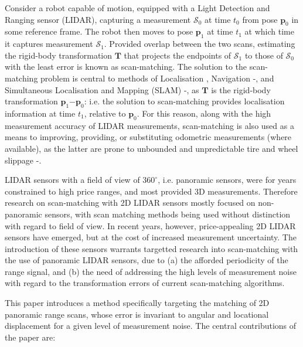 Consider a robot capable of motion, equipped with a Light Detection and Ranging
sensor (LIDAR), capturing a measurement $\mathcal{S}_0$ at time $t_0$ from pose
$\bm{p}_0$ in some reference frame. The robot then moves to pose $\bm{p}_1$ at
time $t_1$ at which time it captures measurement $\mathcal{S}_1$. Provided
overlap between the two scans, estimating the rigid-body transformation
$\bm{T}$ that projects the endpoints of $\mathcal{S}_1$ to those of
$\mathcal{S}_0$ with the least error is known as scan-matching. The solution to
the scan-matching problem is central to methods of Localisation
\cite{lidar_localisation_1}\cite{lidar_localisation_2}, Navigation
\cite{lidar_navigation_1}-\cite{lidar_navigation_4}, and Simultaneous
Localisation and Mapping (SLAM) \cite{lidar_slam_1}-\cite{lidar_slam_5}, as
$\bm{T}$ is the rigid-body transformation $\bm{p}_1$$-$$\bm{p}_0$: i.e. the
solution to scan-matching provides localisation information at time $t_1$,
relative to $\bm{p}_0$. For this reason, along with the high measurement
accuracy of LIDAR measurements, scan-matching is also used as a means to
improving, providing, or substituting odometric measurements (where available),
as the latter are prone to unbounded and unpredictable tire and wheel
slippage \cite{olson}-\cite{lidar_odom_3}.

LIDAR sensors with a field of view of $360^\circ$, i.e. panoramic sensors, were
for years constrained to high price ranges, and most provided 3D measurements.
Therefore research on scan-matching with 2D LIDAR sensors mostly focused on
non-panoramic sensors, with scan matching methods being used without distinction
with regard to field of view. In recent years, however, price-appealing
2D LIDAR sensors have emerged, but at the cost of increased measurement
uncertainty. The introduction of these sensors warrants targetted research
into scan-matching with the use of panoramic LIDAR sensors, due to (a) the
afforded periodicity of the range signal, and (b) the need of
addressing the high levels of measurement noise with regard to the
transformation errors of current scan-matching algorithms.

This paper introduces a method specifically targeting the matching of 2D
panoramic range scans, whose error is invariant to angular and
locational displacement for a given level of measurement noise.
The central contributions of the paper are:

